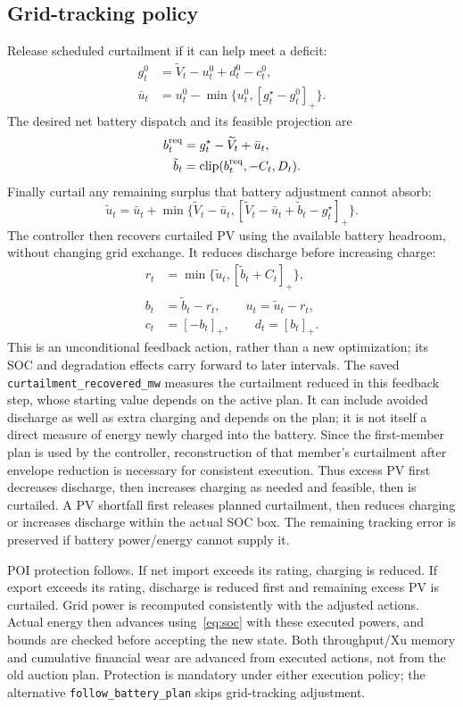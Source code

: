 \documentclass[11pt,a4paper]{article}
\newcommand{\pos}[1]{\left[#1\right]_+}
\DeclareMathOperator{\clip}{clip}
\begin{document}
\subsection{Grid-tracking policy}
Release scheduled curtailment if it can help meet a deficit:
\begin{align}
 g_t^0&=\widetilde V_t-u_t^0+d_t^0-c_t^0,\\
 \bar u_t&=u_t^0-\min\{u_t^0,\pos{g_t^\star-g_t^0}\}.
\end{align}
The desired net battery dispatch and its feasible projection are
\begin{align}
 b_t^{\rm req}&=g_t^\star-\widetilde V_t+\bar u_t,\\
 \tilde b_t&=\clip(b_t^{\rm req},-C_t,D_t).
\end{align}
Finally curtail any remaining surplus that battery adjustment cannot absorb:
\begin{equation}
 \tilde u_t=\bar u_t+
 \min\{\widetilde V_t-\bar u_t,
             \pos{\widetilde V_t-\bar u_t+\tilde b_t-g_t^\star}\}.
\end{equation}
The controller then recovers curtailed PV using the available battery headroom,
without changing grid exchange. It reduces discharge before increasing charge:
\begin{align}
 r_t&=\min\{\tilde u_t,\pos{\tilde b_t+C_t}\},\\
 b_t&=\tilde b_t-r_t,\qquad u_t=\tilde u_t-r_t,\\
 c_t&=\pos{-b_t},\qquad d_t=\pos{b_t}.
\end{align}
This is an unconditional feedback action, rather than a new optimization; its
SOC and degradation effects carry forward to later intervals. The saved
\texttt{curtailment\_recovered\_mw} measures the curtailment reduced in this
feedback step, whose starting value depends on the active plan. It can include avoided discharge as well as extra
charging and depends on the plan; it is not itself a direct measure of energy
newly charged into the battery. Since the first-member plan is used by the
controller, reconstruction of that member's curtailment after envelope reduction
is necessary for consistent execution.
Thus excess PV first decreases discharge, then increases charging as needed and
feasible, then is curtailed. A PV shortfall first releases planned curtailment,
then reduces charging or increases discharge within the actual SOC box. The
remaining tracking error is preserved if battery power/energy cannot supply it.

POI protection follows. If net import exceeds its rating, charging is reduced.
If export exceeds its rating, discharge is reduced first and remaining excess
PV is curtailed. Grid power is recomputed consistently with the adjusted actions.
Actual energy then advances using~\eqref{eq:soc} with these executed powers, and
bounds are checked before accepting the new state. Both throughput/Xu memory and
cumulative financial wear are advanced from executed actions, not from the old
auction plan. Protection is mandatory under either execution policy; the
alternative \texttt{follow\_battery\_plan} skips grid-tracking adjustment.
\end{document}
